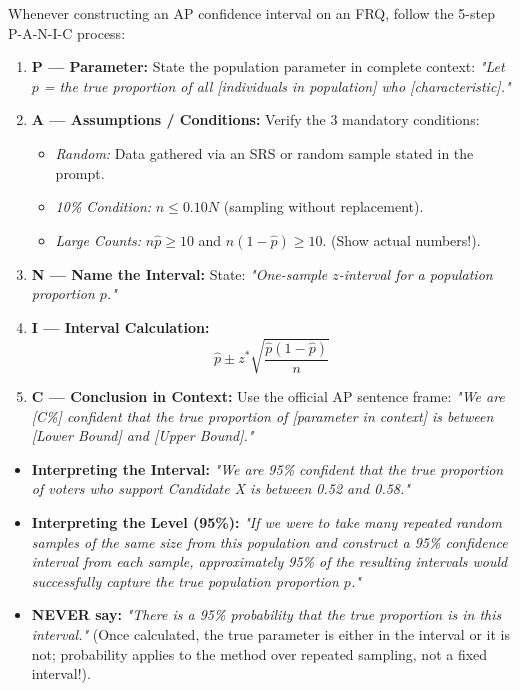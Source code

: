 \begin{lessonbox}
Whenever constructing an AP confidence interval on an FRQ, follow the 5-step P-A-N-I-C process:
\begin{enumerate}[leftmargin=1.5em]
  \item \textbf{P --- Parameter:} State the population parameter in complete context: \textit{"Let $p$ = the true proportion of all [individuals in population] who [characteristic]."}
  \item \textbf{A --- Assumptions / Conditions:} Verify the 3 mandatory conditions:
  \begin{itemize}
    \item \textit{Random:} Data gathered via an SRS or random sample stated in the prompt.
    \item \textit{10\% Condition:} $n \le 0.10N$ (sampling without replacement).
    \item \textit{Large Counts:} $n\hat{p} \ge 10$ and $n(1-\hat{p}) \ge 10$. (Show actual numbers!).
  \end{itemize}
  \item \textbf{N --- Name the Interval:} State: \textit{"One-sample $z$-interval for a population proportion $p$."}
  \item \textbf{I --- Interval Calculation:}
  \begin{equation}
    \hat{p} \pm z^* \sqrt{\frac{\hat{p}(1-\hat{p})}{n}}
  \end{equation}
  \item \textbf{C --- Conclusion in Context:} Use the official AP sentence frame:
  \textit{"We are [C\%] confident that the true proportion of [parameter in context] is between [Lower Bound] and [Upper Bound]."}
\end{enumerate}
\end{lessonbox}

\begin{trapbox}
\begin{itemize}[leftmargin=1.2em]
  \item \textbf{Interpreting the Interval:} \textit{"We are 95\% confident that the true proportion of voters who support Candidate X is between 0.52 and 0.58."}
  \item \textbf{Interpreting the Level (95\%):} \textit{"If we were to take many repeated random samples of the same size from this population and construct a 95\% confidence interval from each sample, approximately 95\% of the resulting intervals would successfully capture the true population proportion $p$."}
  \item \textbf{NEVER say:} \textit{"There is a 95\% probability that the true proportion is in this interval."} (Once calculated, the true parameter is either in the interval or it is not; probability applies to the method over repeated sampling, not a fixed interval!).
\end{itemize}
\end{trapbox}

